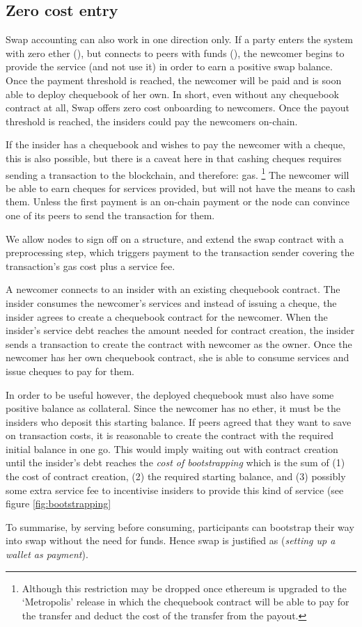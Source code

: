 \subsection{Zero cost entry}

Swap accounting can also work in one direction only. If a party enters the system with zero ether (), but connects to peers with funds (), the newcomer begins to provide the service (and not use it) in order to earn a positive swap balance. Once the payment threshold is reached, the newcomer will be paid and is soon able to deploy chequebook of her own.
In short, even without any chequebook contract at all, Swap offers zero cost onboarding to newcomers. Once the payout threshold is reached, the insiders could pay the newcomers on-chain. 

If the insider has a chequebook and wishes to pay the newcomer with a cheque, this is also possible, but there is a caveat here in that cashing cheques requires sending a transaction to the blockchain, and therefore: gas.%
%
\footnote{Although this restriction may be dropped once ethereum is upgraded to the `Metropolis' release in which the chequebook contract will be able to pay for the transfer and deduct the cost of the transfer from the payout.}
%
The newcomer will be able to earn cheques for services provided, but will not have the means to cash them. 
Unless the first payment is an on-chain payment or the node can convince one of its peers to send the transaction for them.


We allow nodes to sign off on a structure, and extend the swap contract with a preprocessing step, which triggers payment to the transaction sender covering the transaction's gas cost plus a service fee.


  
A newcomer connects to  an insider with an existing chequebook contract. The insider consumes the newcomer's services and instead of issuing a cheque, the insider agrees to create a chequebook contract for the newcomer. When the insider's service debt reaches the amount needed for contract creation, the insider sends a transaction to create the contract with newcomer as the owner. Once the newcomer has her own chequebook contract, she is able to consume services and issue cheques to pay for them.
 
In order to be useful however, the deployed chequebook must also have some positive balance as collateral. Since the newcomer has no ether, it must be the insiders who deposit this starting balance. If peers agreed that they want to save on transaction costs, it is reasonable to create the contract with the required initial balance in one go. This would imply waiting out with contract creation until the insider's debt reaches the \emph{cost of bootstrapping} which is the sum of (1) the cost of contract creation, (2) the required starting balance, and (3) possibly some extra service fee to incentivise insiders to provide this kind of service (see figure \ref{fig:bootstrapping}




To summarise, by serving before consuming, participants can bootstrap their way into swap without the need for funds. Hence swap is justified as (\emph{setting up a wallet as payment}).

